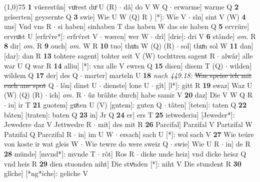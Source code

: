 \documentclass[8pt,a4paper,notitlepage]{article}
\begin{document}
\begin{table}[ht]
\begin{minipage}[t]{0.5\linewidth}
\line(1,0){75} \newline
\textbf{1} vüerestûn] vuͦrest duͦ U (R)  $\cdot$ dâ] do V W Q  $\cdot$ erwarme] warme Q \textbf{2} geîserten] geysernte Q \textbf{3} swie] Wie U W (Q) R ) [*]: Wie V  $\cdot$ sîn] sint V (W) \textbf{4} uns] Vnd vns R  $\cdot$ si haben] sinhaben T das haben W das sie haben Q \textbf{5} ervrüre] ervruͦst U [erfrv́re*]: erfrv́ret V  $\cdot$ wæren] wer W  $\cdot$ drî] [drie]: dri V \textbf{6} stânde] \textit{om.} R \textbf{8} dir] \textit{om.} R \textbf{9} ouch] \textit{om.} W R \textbf{10} tuo] thuͦn W (Q) (R)  $\cdot$ sol] thuͦn sol W \textbf{11} dan] [dar]: dan R \textbf{13} tohtere sagent] tohter seit V (W) tochttren sagent R  $\cdot$ alwâr] alle war U Q war R \textbf{14} alliu] [*]: vnz alle V ewren Q \textbf{15} disen] disem T (Q)  $\cdot$ wilden] wildem Q \textbf{17} der] des Q  $\cdot$ marter] marteln U \textbf{18} \textit{nach 449.18:} \sout{Was speise ich mit euch ane spot} Q   $\cdot$ lôn] dinst U  $\cdot$ dienste] lone U  $\cdot$ gît] [l*]: gitt R \textbf{19} swaz] Waz U (W) (Q) (R)  $\cdot$ ich] \textit{om.} R  $\cdot$ ûz brâhte durch] habe samir V \textbf{20} daz] Die V W Q R  $\cdot$ iu] ir T \textbf{21} guotem] guͦten U (V) [gutem]: guten  Q  $\cdot$ tâten] [teten]: taten Q \textbf{22} bâten] [traten]: baten Q \textbf{23} in] Jr Q \textbf{24} er] ers T \textbf{25} ietwederiu] [Jeweder*]: Jewedere daz V Jettwedre R  $\cdot$ mit] des mit R \textbf{26} Parcifal] Parzifal V Partzifal W Patzifal Q Parczifal R  $\cdot$ in] im U W  $\cdot$ ersach] sach U [*]: wol sach V \textbf{27} Wie teúre von koste ir wat gleis W  $\cdot$ Wie tewre do were sweiz Q  $\cdot$ swie] Wie U R  $\cdot$ in] de R \textbf{28} münde] [mvnd*]: mvnde T  $\cdot$ rôt] Ros R  $\cdot$ dicke unde heiz] vnd dicke heisz Q vnd heis R \textbf{29} dien stuonden niht] Die stvͦnden [*]: niht V Die stundent R \textbf{30} glîche] [*ng*iche]: geliche V \newline
\end{minipage}
\end{table}
\end{document}
